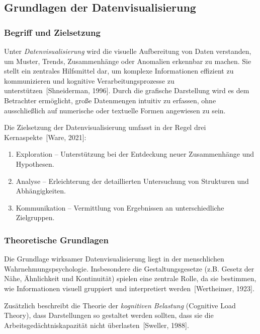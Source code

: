 

\subsection{Grundlagen der Datenvisualisierung}

\subsubsection{Begriff und Zielsetzung}

Unter \textit{Datenvisualisierung} wird die visuelle Aufbereitung von Daten verstanden, um Muster, Trends, Zusammenhänge oder Anomalien erkennbar zu machen. Sie stellt ein zentrales Hilfsmittel dar, um komplexe Informationen effizient zu kommunizieren und kognitive Verarbeitungsprozesse zu unterstützen [Shneiderman, 1996]. Durch die grafische Darstellung wird es dem Betrachter ermöglicht, große Datenmengen intuitiv zu erfassen, ohne ausschließlich auf numerische oder textuelle Formen angewiesen zu sein.


Die Zielsetzung der Datenvisualisierung umfasst in der Regel drei Kernaspekte [Ware, 2021]:


\begin{enumerate}

\item
Exploration – Unterstützung bei der Entdeckung neuer Zusammenhänge und Hypothesen.
\item
Analyse – Erleichterung der detaillierten Untersuchung von Strukturen und Abhängigkeiten.
\item
Kommunikation – Vermittlung von Ergebnissen an unterschiedliche Zielgruppen.

\end{enumerate}

\subsubsection{Theoretische Grundlagen}

Die Grundlage wirksamer Datenvisualisierung liegt in der menschlichen Wahrnehmungspsychologie.
Insbesondere die Gestaltungsgesetze (z.B. Gesetz der Nähe, Ähnlichkeit und Kontinuität) spielen eine zentrale Rolle, da sie bestimmen, wie Informationen visuell gruppiert und interpretiert werden [Wertheimer, 1923].

Zusätzlich beschreibt die Theorie der \textit{kognitiven Belastung} (Cognitive Load Theory), dass Darstellungen so gestaltet werden sollten, dass sie die Arbeitsgedächtniskapazität nicht überlasten [Sweller, 1988].


